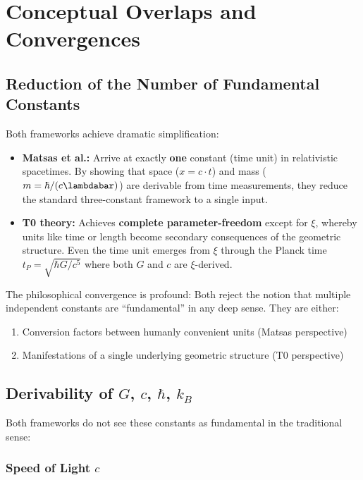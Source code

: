 	\section{Conceptual Overlaps and Convergences}
	
	\subsection{Reduction of the Number of Fundamental Constants}
	
	Both frameworks achieve dramatic simplification:
	
\begin{itemize}
	\item \textbf{Matsas et al.:} Arrive at exactly \textbf{one} constant (time unit) in relativistic spacetimes. By showing that space ($x = c \cdot t$) and mass ($m = \hbar / (c \lambdabar)$) are derivable from time measurements, they reduce the standard three-constant framework to a single input.
	
	\item \textbf{T0 theory:} Achieves \textbf{complete parameter-freedom} except for $\xi$, whereby units like time or length become secondary consequences of the geometric structure. Even the time unit emerges from $\xi$ through the Planck time $t_P = \sqrt{\hbar G/c^5}$ where both $G$ and $c$ are $\xi$-derived.
\end{itemize}
	
	The philosophical convergence is profound: Both reject the notion that multiple independent constants are ``fundamental'' in any deep sense. They are either:
	\begin{enumerate}
		\item Conversion factors between humanly convenient units (Matsas perspective)
		\item Manifestations of a single underlying geometric structure (T0 perspective)
	\end{enumerate}
	
	\subsection{Derivability of $G$, $c$, $\hbar$, $k_B$}
	
	Both frameworks do not see these constants as fundamental in the traditional sense:
	
	\subsubsection{Speed of Light $c$}
	
